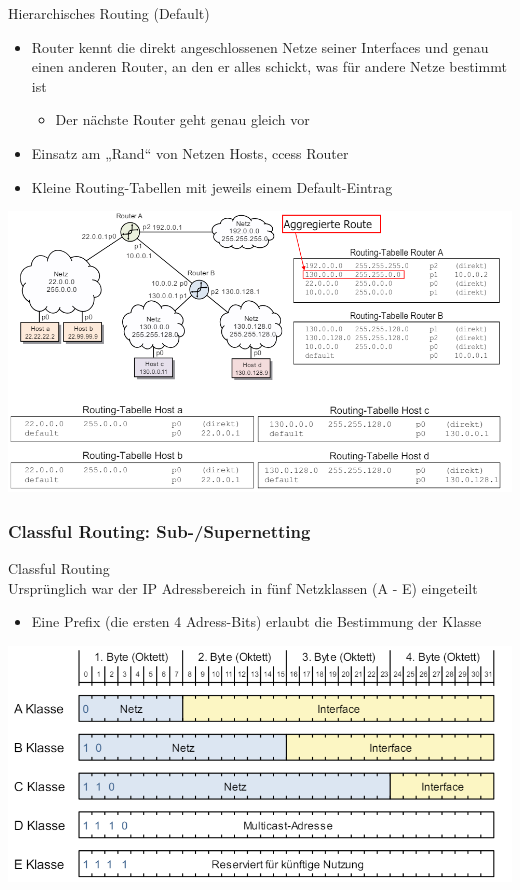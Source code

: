 \begin{concept}{Hierarchisches Routing (Default)}
    \begin{itemize}
        \item Router kennt die direkt angeschlossenen Netze seiner Interfaces und genau einen anderen Router, an den er alles schickt, was für andere Netze bestimmt ist
        \begin{itemize}
            \item Der nächste Router geht genau gleich vor
        \end{itemize}
        \item Einsatz am „Rand“ von Netzen Hosts, ccess Router
        \item Kleine Routing-Tabellen mit jeweils einem Default-Eintrag
    \end{itemize}
        \includegraphics[width=1\linewidth]{images/hierarchisches_routing.png}
\end{concept}

\subsubsection{Classful Routing: Sub-/Supernetting}

\begin{concept}{Classful Routing}\\
    Ursprünglich war der IP Adressbereich in fünf Netzklassen (A - E) eingeteilt
    \begin{itemize}
        \item Eine Prefix (die ersten 4 Adress-Bits) erlaubt die Bestimmung der Klasse
    \end{itemize}
        \includegraphics[width=0.9\linewidth]{images/classfulrouitng.png}
\end{concept}


